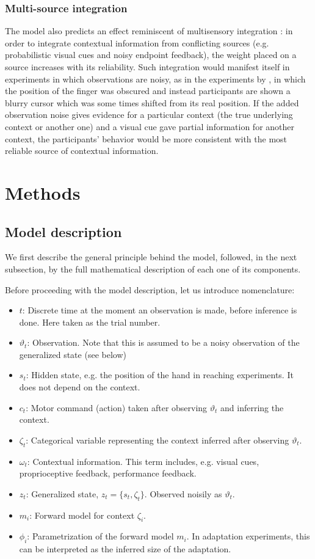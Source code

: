 \documentclass[a4paper,doc,floatsintext,natbib]{apa6}%
\begin{document}
\subsubsection{Multi-source integration}
The model also predicts an effect reminiscent of multisensory integration \citep{Ernst_Humans_2002}: in order to integrate contextual information from conflicting sources (e.g. probabilistic visual cues and noisy endpoint feedback), the weight placed on a source increases with its reliability. Such integration would manifest itself in experiments in which observations are noisy, as in the experiments by \cite{Kording_Bayesian_2004}, in which the position of the finger was obscured and instead participants are shown a blurry cursor which was some times shifted from its real position. If the added observation noise gives evidence for a particular context (the true underlying context or another one) and a visual cue gave partial information for another context, the participants' behavior would be more consistent with the most reliable source of contextual information.


\section{Methods}
\subsection{Model description}
\label{subsection:model-description}
We first describe the general principle behind the model, followed, in the next
subsection, by the full mathematical description of each one of its components.

Before proceeding with the model description, let us introduce nomenclature:
\begin{itemize}
\item $t$: Discrete time at the moment an observation is made, before inference is done. 
Here taken as the trial number.
\item $\vartheta_t$: Observation. Note that this is assumed to be a noisy
observation of the generalized state (see below)
\item $s_t$: Hidden state, e.g. the position of the hand in reaching
experiments. It does not depend on the context.
\item $c_t$: Motor command (action) taken after observing $\vartheta_t$ and inferring the context.
\item $\zeta_t$: Categorical variable representing the context inferred after observing $\vartheta_t$.
\item $\omega_t$: Contextual information. This term includes, e.g. visual cues,
proprioceptive feedback, performance feedback.
\item $z_t$: Generalized state, $z_t = \{s_t, \zeta_t\}$. Observed noisily
as $\vartheta_t$.
\item $m_i$: Forward model for context $\zeta_i$.
\item $\phi_i$: Parametrization of the forward model $m_i$. In adaptation experiments, this
can be interpreted as the inferred size of the adaptation.
\end{itemize}
\end{document}
